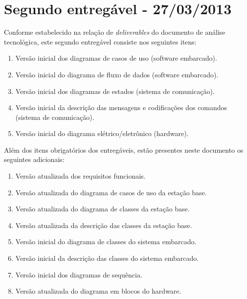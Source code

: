 \chapter{Segundo entregável - 27/03/2013}

Conforme estabelecido na relação de \textit{deliverables} do documento de análise tecnológica, este segundo entregável consiste nos seguintes itens:
\begin{enumerate}[topsep=0pt, partopsep=0pt, itemsep=0pt]
	\item Versão inicial dos diagramas de casos de uso (software embarcado).
	\item Versão inicial do diagrama de fluxo de dados (software embarcado).
	\item Versão inicial dos diagramas de estados (sistema de comunicação).
	\item Versão inicial da descrição das mensagens e codificações dos comandos (sistema de comunicação).
	\item Versão inicial do diagrama elétrico/eletrônico (hardware).
\end{enumerate}

\vspace{12pt}

Além dos itens obrigatórios dos entregáveis, estão presentes neste documento os seguintes adicionais:
\begin{enumerate}
	\item Versão atualizada dos requisitos funcionais.
	\item Versão atualizada do diagrama de casos de uso da estação base.
	\item Versão atualizada do diagrama de classes da estação base.
	\item Versão atualizada da descrição das classes da estação base.
	\item Versão inicial do diagrama de classes do sistema embarcado.
	\item Versão inicial da descrição das classes do sistema embarcado.
	\item Versão inicial dos diagramas de sequência.
	\item Versão atualizada do diagrama em blocos do hardware.
\end{enumerate}